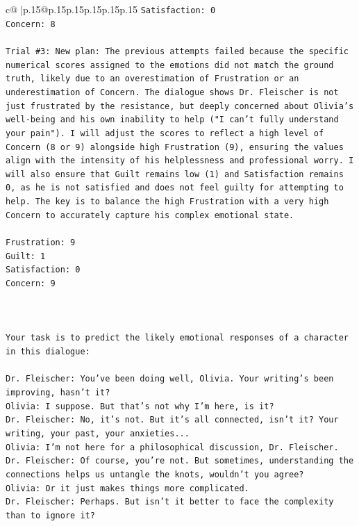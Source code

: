 \documentclass{article}
\begin{document}
{\begin{supertabular}{c@{$\;$}|p{.15\linewidth}@{}p{.15\linewidth}p{.15\linewidth}p{.15\linewidth}p{.15\linewidth}p{.15\linewidth}}
{{{\texttt{Satisfaction: 0} \\
\texttt{Concern: 8} \\
\\ 
\texttt{Trial \#3: New plan: The previous attempts failed because the specific numerical scores assigned to the emotions did not match the ground truth, likely due to an overestimation of Frustration or an underestimation of Concern. The dialogue shows Dr. Fleischer is not just frustrated by the resistance, but deeply concerned about Olivia's well{-}being and his own inability to help ("I can't fully understand your pain"). I will adjust the scores to reflect a high level of Concern (8 or 9) alongside high Frustration (9), ensuring the values align with the intensity of his helplessness and professional worry. I will also ensure that Guilt remains low (1) and Satisfaction remains 0, as he is not satisfied and does not feel guilty for attempting to help. The key is to balance the high Frustration with a very high Concern to accurately capture his complex emotional state.} \\
\\ 
\texttt{Frustration: 9} \\
\texttt{Guilt: 1} \\
\texttt{Satisfaction: 0} \\
\texttt{Concern: 9} \\
\\ 
\\ 
\\ 
\texttt{Your task is to predict the likely emotional responses of a character in this dialogue:} \\
\\ 
\texttt{Dr. Fleischer: You've been doing well, Olivia. Your writing's been improving, hasn't it?} \\
\texttt{Olivia: I suppose. But that's not why I'm here, is it?} \\
\texttt{Dr. Fleischer: No, it's not. But it's all connected, isn't it? Your writing, your past, your anxieties...} \\
\texttt{Olivia: I'm not here for a philosophical discussion, Dr. Fleischer.} \\
\texttt{Dr. Fleischer: Of course, you're not. But sometimes, understanding the connections helps us untangle the knots, wouldn't you agree?} \\
\texttt{Olivia: Or it just makes things more complicated.} \\
\texttt{Dr. Fleischer: Perhaps. But isn't it better to face the complexity than to ignore it?} \\
}}}
\end{supertabular}}
\end{document}
